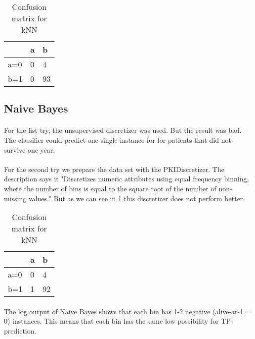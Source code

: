 \documentclass[paper=a4, fontsize=11pt]{scrartcl} %
\numberwithin{equation}{section} %
\numberwithin{figure}{section} %
\numberwithin{table}{section} %
\begin{document}
\vspace{6pt}

\begin{table}[h]
\centering
\begin{tabular}{|l|ll|}
\hline
 & a &	b \\
\hline
a=0 & 0 & 4 \\
b=1 & 0 & 93\\
\hline
\end{tabular}
\caption{Confusion matrix for kNN}
\end{table}


\subsection{Naive Bayes}

\paragraph{}For the fist try, the unsupervised discretizer was used. But the result was bad. The classifier could predict one single instance for for patients that did not survive one year.

\paragraph{}For the second try we prepare the data set with the PKIDiscretizer. The description says it "Discretizes numeric attributes using equal frequency binning, where the number of bins is equal to the square root of the number of non-missing values." But as we can see in \ref{tab:echo:bayes:1c} this discretizer does not perform better.

\begin{table}[h]
\centering
\begin{tabular}{|l|ll|}
\hline
 & a &	b \\
\hline
a=0 & 0 & 4 \\
b=1 & 1 & 92\\
\hline
\end{tabular}
\caption{Confusion matrix for kNN}
\label{tab:echo:bayes:1c}
\end{table}

\paragraph{}The log output of Naive Bayes shows that each bin has 1-2 negative (alive-at-1 = 0) instances. This means that each bin has the same low possibility for TP-prediction.
\end{document}
